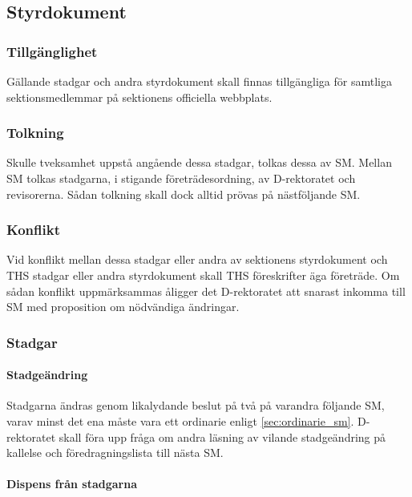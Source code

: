 \documentclass[a4paper,12pt]{article}
\begin{document}
\subsection{Styrdokument}
\label{sec:styrdokument}

\subsubsection{Tillgänglighet}

Gällande stadgar och andra styrdokument skall finnas tillgängliga för samtliga sektionsmedlemmar på sektionens officiella webbplats.

\subsubsection{Tolkning}

Skulle tveksamhet uppstå angående dessa stadgar, tolkas dessa av SM. Mellan SM tolkas stadgarna, i stigande företrädesordning, av D-rektoratet och revisorerna. Sådan tolkning skall dock alltid prövas på nästföljande SM.

\subsubsection{Konflikt}

Vid konflikt mellan dessa stadgar eller andra av sektionens styrdokument och THS stadgar eller andra styrdokument skall THS föreskrifter äga företräde. Om sådan konflikt uppmärksammas åligger det D-rektoratet att snarast inkomma till SM med proposition om nödvändiga ändringar.

\subsubsection{Stadgar}

\paragraph{Stadgeändring}

Stadgarna ändras genom likalydande beslut på två på varandra följande SM, varav minst det ena måste vara ett ordinarie enligt \ref{sec:ordinarie_sm}. D-rektoratet skall föra upp fråga om andra läsning av vilande stadgeändring på kallelse och föredragningslista till nästa SM.

\paragraph{Dispens från stadgarna}
\end{document}
